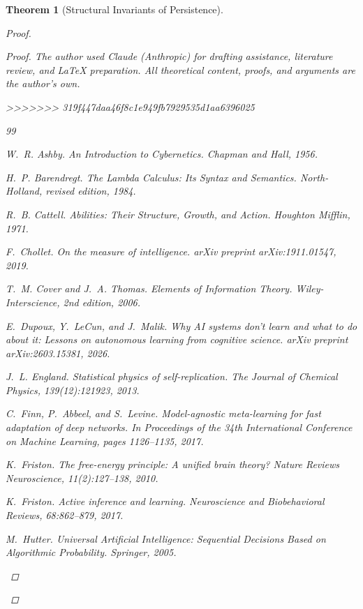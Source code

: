 \documentclass[11pt]{article}
\newtheorem{theorem}{Theorem}
\theoremstyle{definition}
\theoremstyle{remark}
\begin{document}
\begin{theorem}[Structural Invariants of Persistence]
\begin{proof}
\begin{proof}
The author used Claude (Anthropic) for drafting assistance, literature review, and \LaTeX{} preparation. All theoretical content, proofs, and arguments are the author's own.

>>>>>>> 319f447daa46f8c1e949fb7929535d1aa6396025

\begin{thebibliography}{99}

W.~R. Ashby.
\newblock \emph{An Introduction to Cybernetics}.
\newblock Chapman and Hall, 1956.

H.~P. Barendregt.
\newblock \emph{The Lambda Calculus: Its Syntax and Semantics}.
\newblock North-Holland, revised edition, 1984.

R.~B. Cattell.
\newblock \emph{Abilities: Their Structure, Growth, and Action}.
\newblock Houghton Mifflin, 1971.

F.~Chollet.
\newblock On the measure of intelligence.
\newblock \emph{arXiv preprint arXiv:1911.01547}, 2019.

T.~M. Cover and J.~A. Thomas.
\newblock \emph{Elements of Information Theory}.
\newblock Wiley-Interscience, 2nd edition, 2006.

E.~Dupoux, Y.~LeCun, and J.~Malik.
\newblock Why {AI} systems don't learn and what to do about it: Lessons on
  autonomous learning from cognitive science.
\newblock \emph{arXiv preprint arXiv:2603.15381}, 2026.

J.~L. England.
\newblock Statistical physics of self-replication.
\newblock \emph{The Journal of Chemical Physics}, 139(12):121923, 2013.

C.~Finn, P.~Abbeel, and S.~Levine.
\newblock Model-agnostic meta-learning for fast adaptation of deep networks.
\newblock In \emph{Proceedings of the 34th International Conference on Machine
  Learning}, pages 1126--1135, 2017.

K.~Friston.
\newblock The free-energy principle: A unified brain theory?
\newblock \emph{Nature Reviews Neuroscience}, 11(2):127--138, 2010.

K.~Friston.
\newblock Active inference and learning.
\newblock \emph{Neuroscience and Biobehavioral Reviews}, 68:862--879, 2017.

M.~Hutter.
\newblock \emph{Universal Artificial Intelligence: Sequential Decisions Based
  on Algorithmic Probability}.
\newblock Springer, 2005.


\end{thebibliography}
\end{proof}
\end{proof}
\end{theorem}
\end{document}
